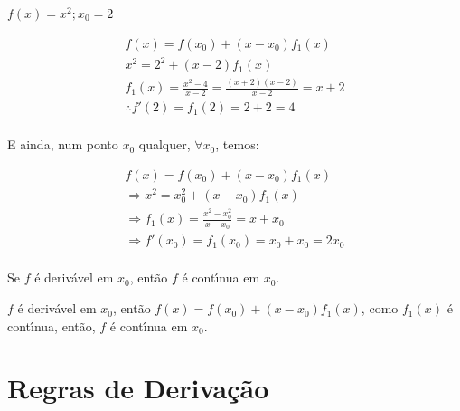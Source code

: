 \documentclass{book}
\begin{document}
\newpage 

\begin{ex}

$f\left( x \right) = x^2;x_0 = 2$

\end{ex}

\begin{sol}

\[
\begin{array}{l}
f\left( x \right) = f\left( {x_0 } \right) + \left( {x - x_0 } \right)f_1
\left( x \right) \\
x^2 = 2^2 + \left( {x - 2} \right)f_1 \left( x \right) \\
f_1 \left( x \right) = \frac{x^2 - 4}{x - 2} = \frac{\left( {x + 2}
\right)\left( {x - 2} \right)}{x - 2} = x + 2 \\
\therefore f'\left( 2 \right) = f_1 \left( 2 \right) = 2 + 2 = 4 \\
\end{array}
\]

E ainda, num ponto $x_0 $ qualquer, $\forall x_0 $, temos:

\[
\begin{array}{l}
f\left( x \right) = f\left( {x_0 } \right) + \left( {x - x_0 } \right)f_1
\left( x \right) \\
\Rightarrow x^2 = x_0^2 + \left( {x - x_0 } \right)f_1 \left( x \right) \\
\Rightarrow f_1 \left( x \right) = \frac{x^2 - x_0^2 }{x - x_0 } = x + x_0
\\
\Rightarrow f'\left( {x_0 } \right) = f_1 \left( {x_0 } \right) = x_0 + x_0 = 2x_0 \\
\end{array}
\]

\end{sol}

\begin{teo}
Se $f$ \'{e} deriv\'avel em $x_0 $, ent\~ao $f$ \'{e} cont\'{\i}nua em $x_0 $.
\end{teo}

\begin{dem}

$f$ \'{e} deriv\'avel em $x_0 $, ent\~ao $f\left( x \right) = f\left( {x_0} \right) + \left( {x - x_0 } \right)f_1 \left( x \right)$, como $f_1 \left(x \right)$ \'{e} cont\'{\i}nua, ent\~ao, $f$ \'{e} cont\'{\i}nua em $x_0$.

\end{dem}


\section{Regras de Deriva\c c\~ao} \label{sec03}
\end{document}
